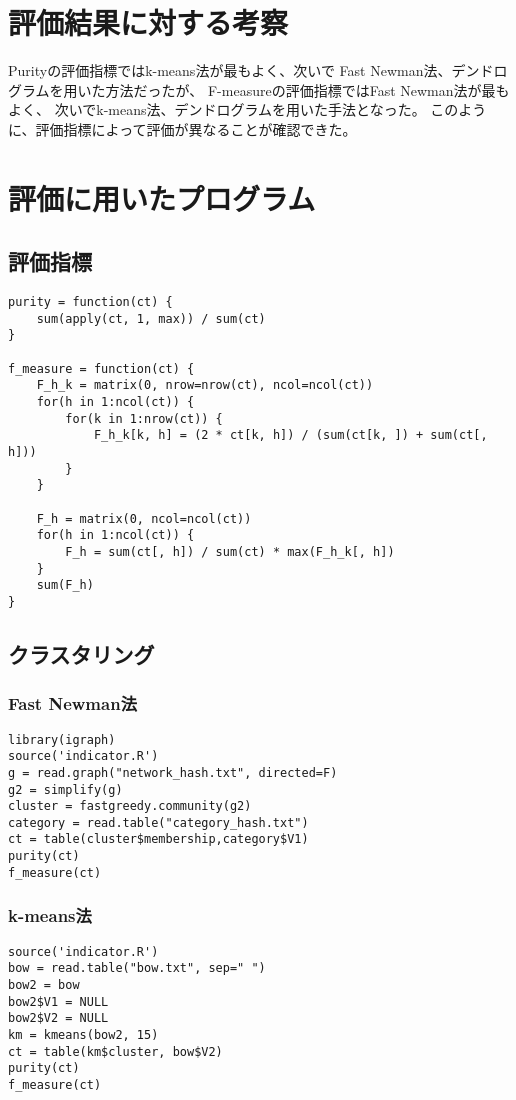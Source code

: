 \documentclass{jsarticle}
\begin{document}
\section{評価結果に対する考察}
Purityの評価指標ではk-means法が最もよく、次いで
Fast Newman法、デンドログラムを用いた方法だったが、
F-measureの評価指標ではFast Newman法が最もよく、
次いでk-means法、デンドログラムを用いた手法となった。
このように、評価指標によって評価が異なることが確認できた。

\appendix
\section{評価に用いたプログラム}
\subsection{評価指標}
\begin{lstlisting}[basicstyle=\ttfamily\footnotesize, frame=single]
purity = function(ct) {
    sum(apply(ct, 1, max)) / sum(ct)
}

f_measure = function(ct) {
    F_h_k = matrix(0, nrow=nrow(ct), ncol=ncol(ct))
    for(h in 1:ncol(ct)) {
        for(k in 1:nrow(ct)) {
            F_h_k[k, h] = (2 * ct[k, h]) / (sum(ct[k, ]) + sum(ct[, h]))
        }
    }

    F_h = matrix(0, ncol=ncol(ct))
    for(h in 1:ncol(ct)) {
        F_h = sum(ct[, h]) / sum(ct) * max(F_h_k[, h])
    }
    sum(F_h)
}
\end{lstlisting}
\subsection{クラスタリング}
\subsubsection{Fast Newman法}
\begin{lstlisting}[basicstyle=\ttfamily\footnotesize, frame=single]
library(igraph)
source('indicator.R')
g = read.graph("network_hash.txt", directed=F)
g2 = simplify(g)
cluster = fastgreedy.community(g2)
category = read.table("category_hash.txt")
ct = table(cluster$membership,category$V1)
purity(ct)
f_measure(ct)
\end{lstlisting}
\subsubsection{k-means法}
\begin{lstlisting}[basicstyle=\ttfamily\footnotesize, frame=single]
source('indicator.R')
bow = read.table("bow.txt", sep=" ")
bow2 = bow
bow2$V1 = NULL
bow2$V2 = NULL
km = kmeans(bow2, 15)
ct = table(km$cluster, bow$V2)
purity(ct)
f_measure(ct)
\end{lstlisting}
\newpage
\end{document}
